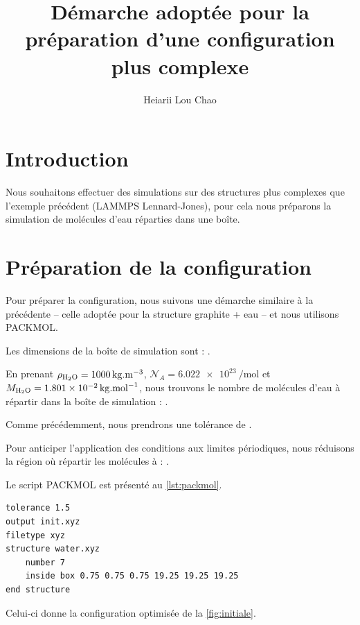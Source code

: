 \documentclass[11pt, a4paper]{article}
\title{Démarche adoptée pour la préparation d'une configuration plus complexe}
\author{Heiarii Lou Chao}
\begin{document}
\maketitle
\tableofcontents

\clearpage
\section*{Introduction}

Nous souhaitons effectuer des simulations sur des structures plus complexes que l'exemple précédent (LAMMPS Lennard-Jones), pour cela nous préparons la simulation de molécules d'eau réparties dans une boîte.

\section{Préparation de la configuration}

Pour préparer la configuration, nous suivons une démarche similaire à la précédente -- celle adoptée pour la structure graphite + eau -- et nous utilisons PACKMOL.

Les dimensions de la boîte de simulation sont : .

En prenant $\rho_{\ce{H2O}} = \qty{1000}{\kg \per \cubic \meter}$, $\mathcal{N}_A = \qty{6.022e+23}{\per \mol}$ et $M_{\ce{H2O}} = \qty{1.801e-02}{\kg \per \mol}$, nous trouvons le nombre de molécules d'eau à répartir dans la boîte de simulation : .

Comme précédemment, nous prendrons une tolérance de .

Pour anticiper l'application des conditions aux limites périodiques, nous réduisons la région où répartir les molécules à : .

Le script PACKMOL est présenté au \autoref{lst:packmol}.

\begin{lstlisting}[caption={Répartition des molécules d'eau}, label={lst:packmol}]
tolerance 1.5
output init.xyz
filetype xyz
structure water.xyz
	number 7
	inside box 0.75 0.75 0.75 19.25 19.25 19.25
end structure
\end{lstlisting}

Celui-ci donne la configuration optimisée de la \autoref{fig:initiale}.
\end{document}
